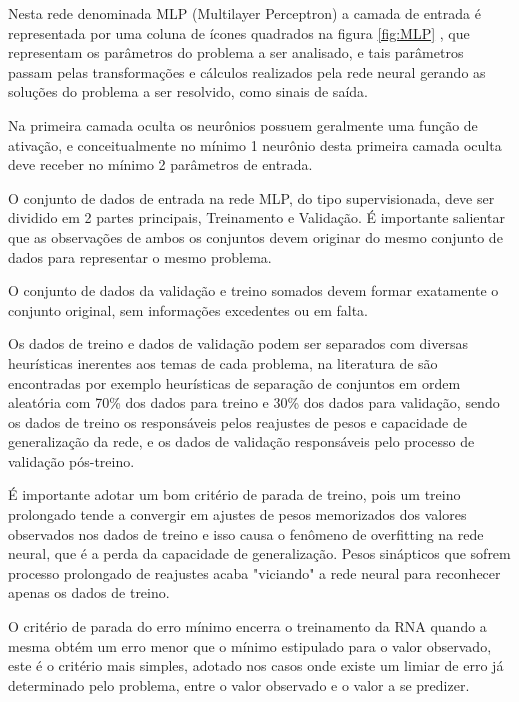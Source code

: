     Nesta rede denominada MLP (Multilayer Perceptron) a camada de entrada é representada por uma coluna de ícones quadrados na figura \ref{fig:MLP} , que representam os parâmetros do problema a ser analisado, e tais parâmetros passam pelas transformações e cálculos realizados pela rede neural gerando as soluções do problema a ser resolvido, como sinais de saída.
    
    Na primeira camada oculta os neurônios possuem geralmente uma função de ativação, e conceitualmente no mínimo 1 neurônio desta primeira camada oculta deve receber no mínimo 2 parâmetros de entrada.
 
    O conjunto de dados de entrada na rede MLP, do tipo supervisionada, deve ser dividido em 2 partes principais, Treinamento e Validação. É importante salientar que as observações de ambos os conjuntos devem originar do mesmo conjunto de dados para representar o mesmo problema.
    
    O conjunto de dados da validação e treino somados devem formar exatamente o conjunto original, sem informações excedentes ou em falta.
    
    Os dados de treino e dados de validação podem ser separados com diversas heurísticas inerentes aos temas de cada problema, na literatura de \cite{DLB} são encontradas por exemplo heurísticas de separação de conjuntos em ordem aleatória com 70\% dos dados para treino e 30\% dos dados para validação, sendo os dados de treino os responsáveis pelos reajustes de pesos e capacidade de generalização da rede, e os dados de validação responsáveis pelo processo de validação pós-treino.
    
    É importante adotar um bom critério de parada de treino, pois um treino prolongado tende a convergir em ajustes de pesos memorizados dos valores observados nos dados de treino e isso causa o fenômeno de overfitting na rede neural, que é a perda da capacidade de generalização. Pesos sinápticos que sofrem processo prolongado de reajustes acaba "viciando" a rede neural para reconhecer apenas os dados de treino.
    
    O critério de parada do erro mínimo encerra o treinamento da RNA quando a mesma obtém um erro menor que o mínimo estipulado para o valor observado, este é o critério mais simples, adotado nos casos onde existe um limiar de erro já determinado pelo problema, entre o valor observado e o valor a se predizer.
    
